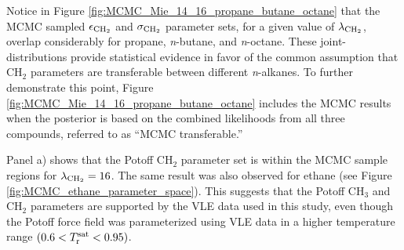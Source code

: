 \documentclass[preprint,letterpaper,floatfix,citeautoscript,aip,jcp]{revtex4-1}
\begin{document}


Notice in Figure \ref{fig:MCMC_Mie_14_16_propane_butane_octane} that the MCMC sampled $\epsilon_{\rm CH_2}$ and $\sigma_{\rm CH_2}$ parameter sets, for a given value of $\lambda_{\rm CH_2}$, overlap considerably for propane, \textit{n}-butane, and \textit{n}-octane. These joint-distributions provide statistical evidence in favor of the common assumption that CH$_2$ parameters are transferable between different \textit{n}-alkanes. To further demonstrate this point, Figure \ref{fig:MCMC_Mie_14_16_propane_butane_octane} includes the MCMC results when the posterior is based on the combined likelihoods from all three compounds, referred to as ``MCMC transferable.''

Panel a) shows that the Potoff CH$_2$ parameter set is within the MCMC sample regions for $\lambda_{\rm CH_2} = 16$. The same result was also observed for ethane (see Figure \ref{fig:MCMC_ethane_parameter_space}). This suggests that the Potoff CH$_3$ and CH$_2$ parameters are supported by the VLE data used in this study, even though the Potoff force field was parameterized using VLE data in a higher temperature range $(0.6 < T_{\rm r}^{\rm sat} < 0.95)$. 
\end{document}
